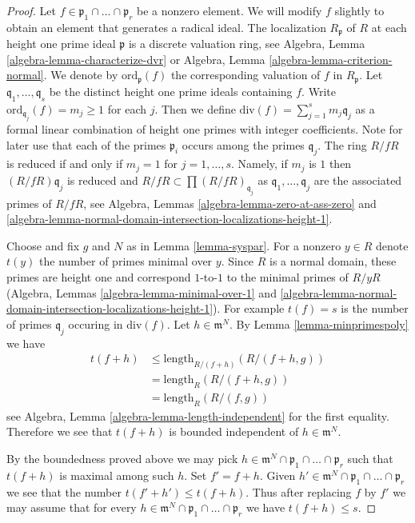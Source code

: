 \begin{proof}
Let $f \in \mathfrak p_1 \cap \ldots \cap \mathfrak p_r$ be a nonzero element.
We will modify $f$ slightly to obtain an element that generates a radical ideal.
The localization $R_\mathfrak p$ of $R$ at each height one prime
ideal $\mathfrak p$ is a discrete valuation ring, see
Algebra, Lemma \ref{algebra-lemma-characterize-dvr} or
Algebra, Lemma \ref{algebra-lemma-criterion-normal}.
We denote by $\text{ord}_\mathfrak p(f)$ the corresponding
valuation of $f$ in $R_{\mathfrak p}$. Let
$\mathfrak q_1, \ldots, \mathfrak q_s$
be the distinct height one prime ideals containing $f$.
Write $\text{ord}_{\mathfrak q_j}(f) = m_j \geq 1$ for each $j$.
Then we define $\text{div}(f) = \sum_{j = 1}^s m_j\mathfrak q_j$
as a formal linear combination of
height one primes with integer coefficients.
Note for later use that each of the primes $\mathfrak p_i$
occurs among the primes $\mathfrak q_j$.
The ring $R/fR$ is reduced if and only if
$m_j = 1$ for $j = 1, \ldots, s$. Namely, if $m_j$ is $1$ then
$(R/fR)\mathfrak q_j$ is reduced and
$R/fR \subset \prod (R/fR)_{\mathfrak q_j}$ as
$\mathfrak q_1, \ldots, \mathfrak q_j$ are the associated primes
of $R/fR$, see Algebra, Lemmas
\ref{algebra-lemma-zero-at-ass-zero} and
\ref{algebra-lemma-normal-domain-intersection-localizations-height-1}.

\medskip\noindent
Choose and fix $g$ and $N$ as in Lemma \ref{lemma-syspar}.
For a nonzero $y \in R$ denote $t(y)$ the number of primes minimal over $y$.
Since $R$ is a normal domain, these primes
are height one and correspond $1$-to-$1$ to the minimal primes of
$R/yR$ (Algebra, Lemmas \ref{algebra-lemma-minimal-over-1} and
\ref{algebra-lemma-normal-domain-intersection-localizations-height-1}).
For example $t(f) = s$ is the number
of primes $\mathfrak q_j$ occuring in $\text{div}(f)$.
Let $h \in \mathfrak m^N$. By Lemma \ref{lemma-minprimespoly} we have
\begin{align*}
t(f + h) & \leq \text{length}_{R/(f + h)}(R/(f + h, g)) \\
& = \text{length}_R(R/(f + h, g)) \\
& = \text{length}_R(R/(f, g))
\end{align*}
see Algebra, Lemma \ref{algebra-lemma-length-independent}
for the first equality.
Therefore we see that $t(f + h)$ is bounded independent of
$h \in \mathfrak m^N$.

\medskip\noindent
By the boundedness proved above we may pick
$h \in \mathfrak m^N \cap \mathfrak p_1 \cap \ldots \cap \mathfrak p_r$
such that $t(f + h)$ is maximal among such $h$. Set $f' = f + h$.
Given $h' \in \mathfrak m^N \cap \mathfrak p_1 \cap \ldots \cap \mathfrak p_r$
we see that the number $t(f' + h') \leq t(f + h)$.
Thus after replacing $f$ by $f'$ we may assume that for every
$h \in \mathfrak m^N \cap \mathfrak p_1 \cap \ldots \cap \mathfrak p_r$
we have $t(f + h) \leq s$.


\end{proof}
